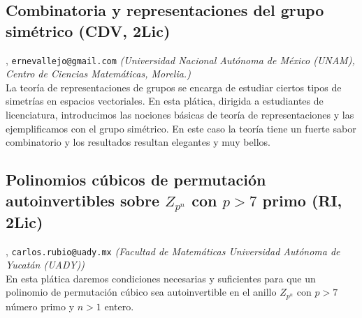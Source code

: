 \subsection{\sffamily Combinatoria y representaciones del grupo sim\'etrico {\footnotesize (CDV, 2Lic)}} \label{reg-410} 
, {\tt ernevallejo@gmail.com}  {\slshape (Universidad Nacional Aut\'onoma de M\'exico (UNAM), Centro de Ciencias Matem\'aticas, Morelia.)}\\
          \noindent La teor\'ia de representaciones de grupos se encarga de estudiar ciertos tipos de simetr\'ias en espacios vectoriales. En esta pl\'atica, dirigida a estudiantes de licenciatura, introducimos las nociones b\'asicas de teor\'ia de representaciones y las ejemplificamos con el grupo sim\'etrico. En este caso la teor\'ia tiene un fuerte sabor combinatorio y los resultados resultan elegantes y muy bellos.
\subsection{\sffamily Polinomios c\'ubicos de permutaci\'on autoinvertibles sobre $Z_{p^n}$ con $p>7$ primo {\footnotesize (RI, 2Lic)}} \label{reg-400} 
, {\tt carlos.rubio@uady.mx}  {\slshape (Facultad de Matem\'aticas Universidad Aut\'onoma de Yucat\'an (UADY))}\\
          \noindent En esta pl\'atica daremos condiciones necesarias y suficientes para que un polinomio de permutaci\'on c\'ubico sea autoinvertible en el anillo $Z_{p^n}$ con $p>7$ n\'umero primo y $n>1$ entero.
